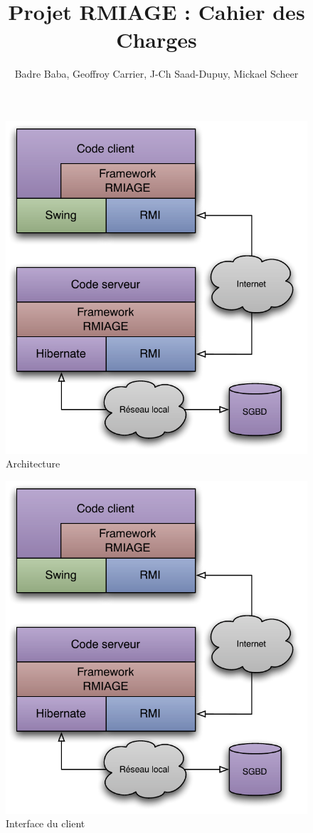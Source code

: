 \documentclass[a4paper,10pt,twoside]{article}
\title{Projet RMIAGE : Cahier des Charges}
\author{
	Badre Baba, Geoffroy Carrier, J-Ch Saad-Dupuy, Mickael Scheer
}
\begin{document}
	\begin{figure}[!h]
	\includegraphics{../diagrammes/architecture.pdf}
	\caption{Architecture}
	\label{fig:archi}
	\end{figure}

	\begin{figure}[!h]
	\includegraphics{../diagrammes/architecture.pdf}
	\caption{Interface du client}
	\label{fig:client}
	\end{figure}




\end{document}

